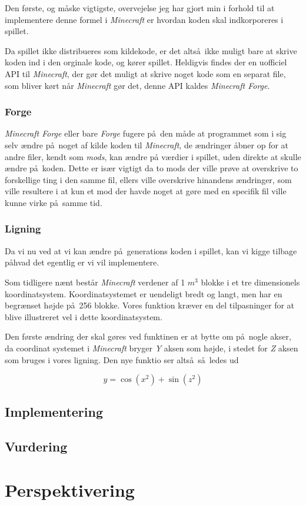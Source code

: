 \documentclass[a4paper,12pt]{report}
\begin{document}
		

		Den f\o rste, og m\aa ske vigtigste, overvejelse jeg har gjort min i forhold til at implementere denne formel i \emph{Minecraft}
		er hvordan koden skal indkorporeres i spillet.

		Da spillet ikke distribueres som kildekode, er det alts\aa \ ikke muligt bare at skrive koden ind i den orginale kode, og k\o rer spillet.
		Heldigvis findes der en uofficiel API til \emph{Minecraft}, der g\o r det muligt at skrive noget kode som en separat file, som bliver k\o rt
		n\aa r \emph{Minecraft} g\o r det, denne API kaldes \emph{Minecraft Forge}.

		\subsubsection{Forge}
		\emph{Minecraft Forge} eller bare \emph{Forge} fugere p\aa \ den m\aa de at programmet som i sig selv \ae ndre p\aa \ noget af
		kilde koden til \emph{Minecraft}, de \ae ndringer \aa bner op for at andre filer, kendt som \emph{mods}, kan \ae ndre p\aa
		v\ae rdier i spillet, uden direkte at skulle \ae ndre p\aa \ koden. Dette er is\ae r vigtigt da to mods der ville pr\o ve at overskrive
		to forskellige ting i den samme fil, ellers ville overskrive hinandens \ae ndringer, som ville resultere i at kun et mod der havde noget
		at g\o re med en specifik fil ville kunne virke p\aa \ samme tid.

		\subsubsection{Ligning}
		Da vi nu ved at vi kan \ae ndre p\aa \ generations koden i spillet, kan vi kigge tilbage p\aa hvad det egentlig er vi vil implementere.

		Som tidligere n\ae nt best\aa r \emph{Minecraft} verdener af 1 \(m^3\) blokke i et tre dimensionels koordinatsystem. Koordinatsystemet
		er uendeligt bredt og langt, men har en begr\ae nset h\o jde p\aa \ 256 blokke.
		Vores funktion kr\ae ver en del tilpasninger for at blive illustreret vel i dette koordinatsystem.

		Den f\o rste \ae ndring der skal g\o res ved funktinen er at bytte om p\aa \ nogle akser,
		da coordinat systemet i \emph{Minecraft} bryger \emph{Y} aksen som h\o jde, i stedet for \emph{Z} aksen som bruges
		i vores ligning. Den nye funktio ser alts\aa \ s\aa \ ledes ud

		\[y = \cos (x^2) + \sin (z^2)\]		
	\subsection{Implementering}
	\subsection{Vurdering}
	\section{Perspektivering}
\end{document}
